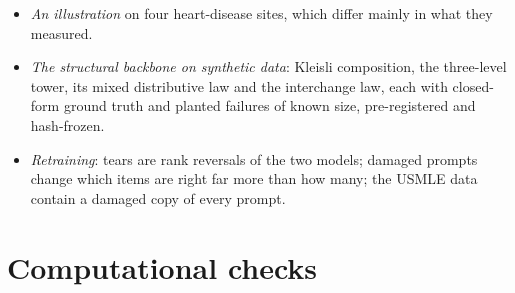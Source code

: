 \documentclass[11pt]{article}
\theoremstyle{definition}
\theoremstyle{remark}
\begin{document}
\begin{itemize}[leftmargin=*,nosep]
  chain seen with error; the test's power against longer memory at these sizes is reported.
\item \emph{An illustration} on four heart-disease sites, which differ mainly in what they measured.
\item \emph{The structural backbone on synthetic data}: Kleisli composition, the three-level tower, its mixed distributive law and the
  interchange law, each with closed-form ground truth and planted failures of known size, pre-registered and hash-frozen.
\item \emph{Retraining}: tears are rank reversals of the two models; damaged prompts change which items are right far more than how many;
  the USMLE data contain a damaged copy of every prompt.
\end{itemize}

\section{Computational checks}\label{sec:code}
\end{document}
